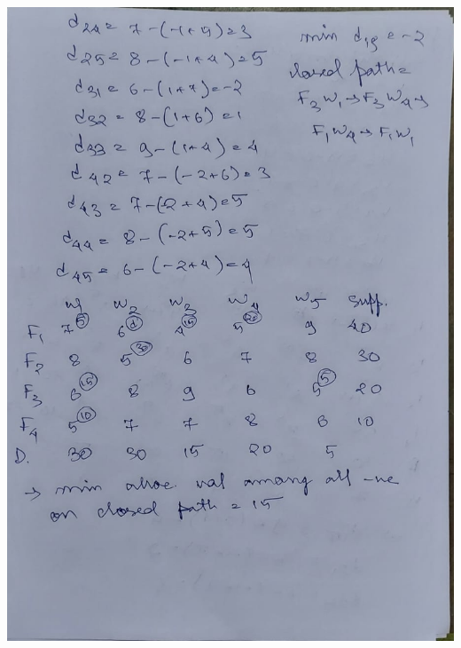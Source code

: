 \documentclass[12pt, letterpaper, twoside]{book}
\begin{document}
\includegraphics[width=\paperwidth, height=\paperheight]{Page17}
\end{document}

